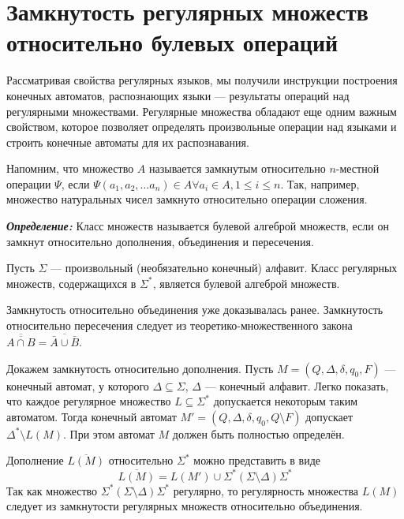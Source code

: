 \section[Замкнутость относительно булевых операций]{Замкнутость регулярных множеств относительно булевых операций}
\label{Chapter5Closure}

Рассматривая свойства регулярных языков, мы получили инструкции построения конечных автоматов, распознающих языки --- результаты операций над регулярными множествами. Регулярные множества обладают еще одним важным свойством, которое позволяет определять произвольные операции над языками и строить конечные автоматы для их распознавания.

Напомним, что множество $A$ называется замкнутым относительно $n$-местной операции $\Psi$, если $\Psi(a_1, a_2, \ldots a_n) \in A \forall a_i \in A, 1 \leq i \leq n $. Так, например, множество натуральных чисел замкнуто относительно операции сложения. 

\textbf{\textit{Определение:}} Класс множеств называется булевой алгеброй множеств, если он замкнут относительно дополнения, объединения и пересечения.

\begin{mytheorem}
Пусть $\Sigma$ --- произвольный (необязательно конечный) алфавит. Класс регулярных множеств, содержащихся в $\Sigma^*$, является булевой алгеброй множеств.
\end{mytheorem}
\begin{myproof}
Замкнутость относительно объединения уже доказывалась ранее. Замкнутость относительно пересечения следует из теоретико-множественного закона $\overline{\overline{ A \cap B }} = \overline {\bar A \cup \bar B}$.

Докажем замкнутость относительно дополнения. Пусть $M = (Q, \Delta, \delta, q_0, F)$ --- конечный автомат, у которого $\Delta \subseteq \Sigma$, $\Delta$ --- конечный алфавит. Легко показать, что каждое регулярное множество $L \subseteq \Sigma^* $ допускается некоторым таким автоматом. Тогда конечный автомат $M' = (Q, \Delta, \delta, q_0, Q \setminus F)$ допускает $\Delta^* \setminus L(M)$. При этом автомат $M$ должен быть полностью определён. 

Дополнение $\overline {L(M)}$ относительно $\Sigma^*$ можно представить в виде 
\[
\overline {L(M)} = L(M') \cup \Sigma^*(\Sigma \setminus \Delta)\Sigma^*
\]
Так как множество $\Sigma^*(\Sigma \setminus \Delta)\Sigma^*$ регулярно, то регулярность множества $L(M)$ следует из замкнутости регулярных множеств относительно объединения.
\end{myproof}

